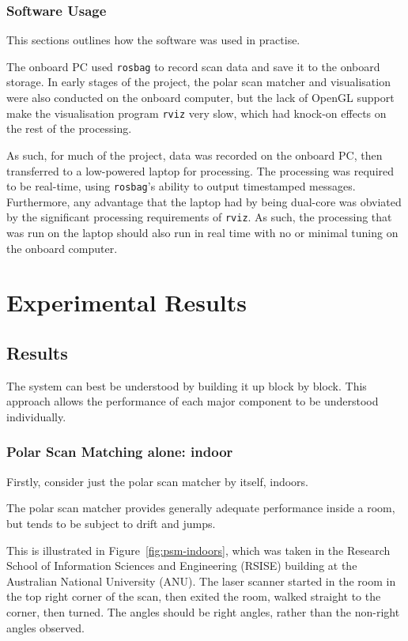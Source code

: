 \documentclass[12pt,oneside,a4paper]{book}
\begin{document}
\section{Software Usage}
\label{sec:software-usage}

This sections outlines how the software was used in practise.

The onboard PC used \texttt{rosbag} to record scan data and save it to
the onboard storage. In early stages of the project, the polar scan
matcher and visualisation were also conducted on the onboard computer,
but the lack of OpenGL support make the visualisation program
\texttt{rviz} very slow, which had knock-on effects on the rest of the
processing.

As such, for much of the project, data was recorded on the onboard PC,
then transferred to a low-powered laptop for processing. The
processing was required to be real-time, using \texttt{rosbag}'s
ability to output timestamped messages. Furthermore, any advantage
that the laptop had by being dual-core was obviated by the significant
processing requirements of \texttt{rviz}. As such, the processing that
was run on the laptop should also run in real time with no or minimal
tuning on the onboard computer.

\part{Experimental Results}
\chapter{Results}
\label{cha:results}

The system can best be understood by building it up block by
block. This approach allows the performance of each major component to
be understood individually.

\section{Polar Scan Matching alone: indoor}
\label{sec:psm-indoor}

Firstly, consider just the polar scan matcher by itself, indoors.

The polar scan matcher provides generally adequate performance inside
a room, but tends to be subject to drift and jumps. 

This is illustrated in Figure~\ref{fig:psm-indoors}, which was taken
in the Research School of Information Sciences and Engineering (RSISE)
building at the Australian National University (ANU). The laser scanner
started in the room in the top right corner of the scan, then exited
the room, walked straight to the corner, then turned. The angles
should be right angles, rather than the non-right angles observed.
\end{document}
